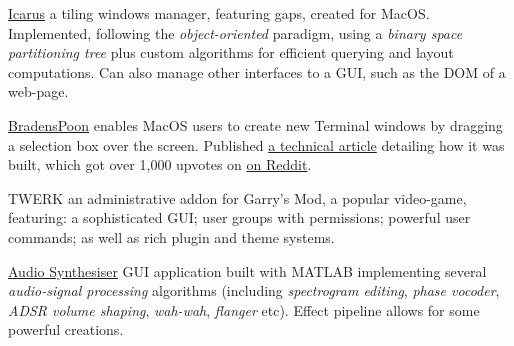 
\begin{cvopensource}
  \cvproject
    {\href{https://github.com/Braden1996/Icarus}{Icarus}}
    {
      a tiling windows manager, featuring gaps, created for MacOS. Implemented, following the \textit{object-oriented} paradigm, using a \textit{binary space partitioning tree} plus custom algorithms for efficient querying and layout computations. Can also manage other interfaces to a GUI, such as the DOM of a web-page.
    }

  \cvproject
    {\href{https://github.com/Braden1996/BradensPoon}{BradensPoon}}
    {
      enables MacOS users to create new Terminal windows by dragging a selection box over the screen. Published \href{https://blog.theodo.fr/2018/03/making-runtime-funtime-hammerspoon/}{a technical article} detailing how it was built, which got over 1,000 upvotes on \href{https://www.reddit.com/r/unixporn/comments/82opm5/ocmacos_drawing_iterm_windows/}{on Reddit}.
    }

  \cvproject
    {TWERK}
    {
      an administrative addon for Garry's Mod, a popular video-game, featuring: a sophisticated GUI; user groups with permissions; powerful user commands; as well as rich plugin and theme systems.
    }

  \cvproject
    {\href{https://github.com/Braden1996/Audio-Synthesiser}{Audio Synthesiser}}
    {
      GUI application built with MATLAB implementing several \textit{audio-signal processing} algorithms (including \textit{spectrogram editing}, \textit{phase vocoder}, \textit{ADSR volume shaping}, \textit{wah-wah}, \textit{flanger} etc). Effect pipeline allows for some powerful creations.
    }
\end{cvopensource}
